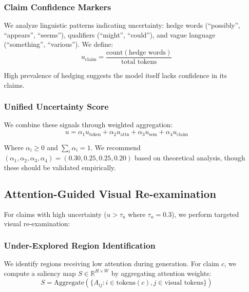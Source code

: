 \documentclass[12pt]{article}
\begin{document}
\subsubsection{Claim Confidence Markers}

We analyze linguistic patterns indicating uncertainty: hedge words (``possibly'', ``appears'', ``seems''), qualifiers (``might'', ``could''), and vague language (``something'', ``various''). We define:
\begin{equation}
u_{\text{claim}} = \frac{\text{count}(\text{hedge words})}{\text{total tokens}}
\end{equation}

High prevalence of hedging suggests the model itself lacks confidence in its claims.

\subsubsection{Unified Uncertainty Score}

We combine these signals through weighted aggregation:
\begin{equation}
u = \alpha_1 u_{\text{token}} + \alpha_2 u_{\text{attn}} + \alpha_3 u_{\text{sem}} + \alpha_4 u_{\text{claim}}
\end{equation}

Where $\alpha_i \geq 0$ and $\sum_i \alpha_i = 1$. We recommend $(\alpha_1, \alpha_2, \alpha_3, \alpha_4) = (0.30, 0.25, 0.25, 0.20)$ based on theoretical analysis, though these should be validated empirically.

\subsection{Attention-Guided Visual Re-examination}

For claims with high uncertainty ($u > \tau_u$ where $\tau_u = 0.3$), we perform targeted visual re-examination:

\subsubsection{Under-Explored Region Identification}

We identify regions receiving low attention during generation. For claim $c$, we compute a saliency map $S \in \mathbb{R}^{H \times W}$ by aggregating attention weights:
\begin{equation}
S = \text{Aggregate}(\{A_{ij} : i \in \text{tokens}(c), j \in \text{visual tokens}\})
\end{equation}
\end{document}

